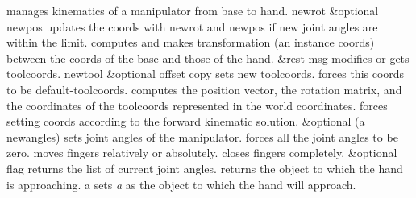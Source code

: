 \begin{refdesc}	
{manages kinematics of a manipulator from base to hand.}
 {newrot \&optional newpos}{ 
updates the coords with newrot and newpos if new joint angles are within the 
limit.
}
  {}{
computes and makes transformation (an instance coords) 
between the coords of the 
base and those of the hand. 
}
  {\&rest msg}{
modifies or gets toolcoords.
}
  {newtool \&optional offset copy}{
sets new toolcoords.
}
  {}{
forces this coords to be default-toolcoords.
}
  {}{
computes the position vector, the rotation matrix, and the coordinates of the 
toolcoords represented in the world coordinates. 
}
  {}{
forces setting coords according to the forward kinematic solution.
}
  {\&optional (a newangles)}{
sets joint angles of the manipulator.
}
  {}{
forces all the joint angles to be zero.
}
{moves fingers relatively or absolutely.
}
 {}{
closes fingers completely.
}
 {\&optional flag}{
returns the list of current joint angles.
}
  {}{
returns the object to which the hand is approaching.
}
  {a}{
sets {\it a} as the object to which the hand will approach.
}
\end{refdesc}
